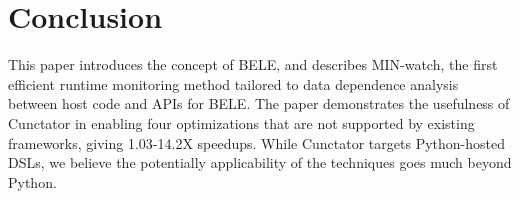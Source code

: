 \documentclass[sigconf]{acmart}\settopmatter{printfolios=true,printccs=false,printacmref=false}\setcopyright{none}
\begin{document}


\section{Conclusion}

This paper introduces the concept of BELE, and describes MIN-watch, the first efficient runtime monitoring method tailored to data dependence analysis between host code and APIs for BELE. The paper demonstrates the usefulness of Cunctator in enabling four optimizations that are not supported by existing frameworks, giving 1.03-14.2X speedups. While Cunctator targets Python-hosted DSLs, we believe the potentially applicability of the techniques goes much beyond Python. 

\balance



\end{document}
